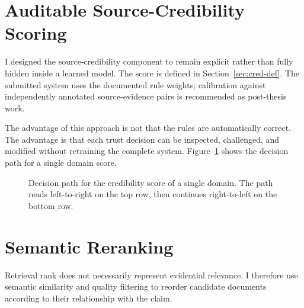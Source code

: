 \documentclass[12pt,a4paper,openany]{report}
\begin{document}
\section{Auditable Source-Credibility Scoring}
I designed the source-credibility component to remain explicit rather than fully hidden inside a learned model. The score is defined in Section~\ref{sec:cred-def}. The submitted system uses the documented rule weights; calibration against independently annotated source-evidence pairs is recommended as post-thesis work.

The advantage of this approach is not that the rules are automatically correct. The advantage is that each trust decision can be inspected, challenged, and modified without retraining the complete system. Figure~\ref{fig:credibility-flow} shows the decision path for a single domain score.

\begin{figure}[H]
\centering
{}
\caption{Decision path for the credibility score of a single domain. The path reads left-to-right on the top row, then continues right-to-left on the bottom row.}
\label{fig:credibility-flow}
\end{figure}

\section{Semantic Reranking}
Retrieval rank does not necessarily represent evidential relevance. I therefore use semantic similarity and quality filtering to reorder candidate documents according to their relationship with the claim.
\end{document}
